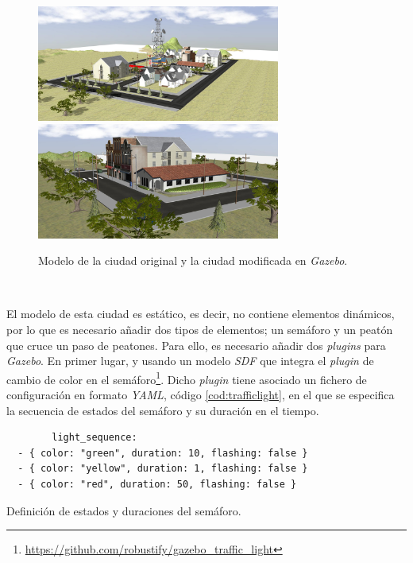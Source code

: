 \begin{figure} [h!]
	\begin{center}
		\includegraphics[width=8cm]{figs/city2}\includegraphics[width=8cm]{figs/smallcity}
	\end{center}
	\caption{Modelo de la ciudad original y la ciudad modificada en \textit{Gazebo}.}
	\label{fig:city}
\end{figure}\

El modelo de esta ciudad es estático, es decir, no contiene elementos dinámicos, por lo que es necesario añadir dos tipos de elementos; un semáforo y un peatón que cruce un paso
de peatones. Para ello, es necesario añadir dos \textit{plugins} para \textit{Gazebo}. En primer lugar, y usando un modelo \textit{SDF} que integra el \textit{plugin} de cambio de
color en el semáforo\footnote{\url{https://github.com/robustify/gazebo_traffic_light}}. Dicho \textit{plugin} tiene asociado un fichero de configuración en formato \textit{YAML},
código \ref{cod:trafficlight}, en el que se especifica la secuencia de estados del semáforo y su duración en el tiempo.\\

\begin{code}[h]
	\begin{lstlisting}
		light_sequence:
  - { color: "green", duration: 10, flashing: false }
  - { color: "yellow", duration: 1, flashing: false }
  - { color: "red", duration: 50, flashing: false }
	\end{lstlisting}
	\caption[Definición de estados y duraciones del semáforo.]{Definición de estados y duraciones del semáforo.}
	\label{cod:trafficlight}
\end{code}

